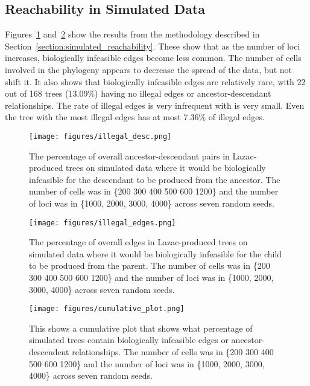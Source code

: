 \subsection{Reachability in Simulated Data}\label{section:simulated_reachability_res}

Figures~\ref{fig:illegal_desc} and~\ref{fig:illegal_edges} show the results from the methodology described in Section~\ref{section:simulated_reachability}. These show that as the number of loci increases, biologically infeasible edges become less common. The number of cells involved in the phylogeny appears to decrease the spread of the data, but not shift it. It also shows that biologically infeasible edges are relatively rare, with 22 out of 168 trees (13.09\%) having no illegal edges or ancestor-descendant relationships. The rate of illegal edges is very infrequent with is very small. Even the tree with the most illegal edges has at most 7.36\% of illegal edges. 

\begin{figure}[ht]
    \centering
    \texttt{[image: figures/illegal\_desc.png]} 
    \caption{The percentage of overall ancestor-descendant pairs in Lazac-produced trees on simulated data where it would be biologically infeasible for the descendant to be produced from the ancestor. The number of cells was in \{200 300 400 500 600 1200\} and the number of loci was in \{1000, 2000, 3000, 4000\} across seven random seeds.}\label{fig:illegal_desc}
\end{figure}

\begin{figure}[ht]
    \centering
    \texttt{[image: figures/illegal\_edges.png]}
    \caption{The percentage of overall edges in Lazac-produced trees on simulated data where it would be biologically infeasible for the child to be produced from the parent. The number of cells was in \{200 300 400 500 600 1200\} and the number of loci was in \{1000, 2000, 3000, 4000\} across seven random seeds.}\label{fig:illegal_edges}
\end{figure}

\begin{figure}[ht]
    \centering
    \texttt{[image: figures/cumulative\_plot.png]}
    \caption{This shows a cumulative plot that shows what percentage of simulated trees contain biologically infeasible edges or ancestor-descendent relationships. The number of cells was in \{200 300 400 500 600 1200\} and the number of loci was in \{1000, 2000, 3000, 4000\} across seven random seeds.}\label{fig:cumulative_trees}
\end{figure}

